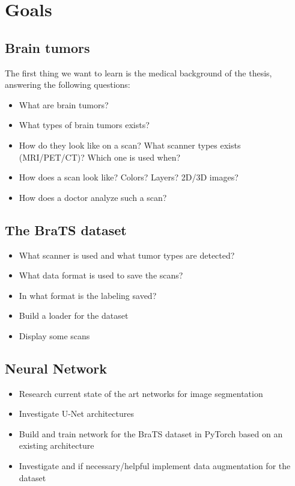 \chapter{Goals}

\section{Brain tumors}
The first thing we want to learn is the medical background of the thesis, answering the following questions:
\begin{itemize}
    \item What are brain tumors?
    \item What types of brain tumors exists?
    \item How do they look like on a scan? What scanner types exists (MRI/PET/CT)? Which one is used when?
    \item How does a scan look like? Colors? Layers? 2D/3D images?
    \item How does a doctor analyze such a scan?
\end{itemize}

\section{The BraTS dataset}
\begin{itemize}
    \item What scanner is used and what tumor types are detected?
    \item What data format is used to save the scans?
    \item In what format is the labeling saved?
    \item Build a loader for the dataset
    \item Display some scans
\end{itemize}

\section{Neural Network}

\begin{itemize}
    \item Research current state of the art networks for image segmentation
    \item Investigate U-Net architectures
    \item Build and train network for the BraTS dataset in PyTorch based on an existing architecture
    \item Investigate and if necessary/helpful implement data augmentation for the dataset
\end{itemize}

